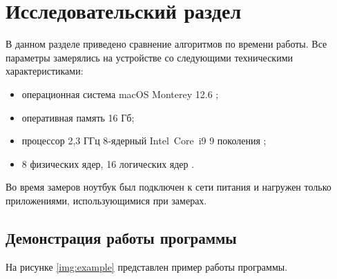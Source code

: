 \chapter{Исследовательский раздел}
\label{cha:research}

В данном разделе приведено сравнение алгоритмов по времени работы.
Все параметры замерялись на устройстве со следующими техническими характеристиками:
\begin{itemize}
	\item операционная система macOS Monterey 12.6 \cite{monterey};
	\item оперативная память 16 Гб;
	\item процессор 2,3 ГГц 8‑ядерный Intel Core i9 9 поколения \cite{intel};
	\item 8 физических ядер, 16 логических ядер \cite{intel}.
\end{itemize}

Во время замеров ноутбук был подключен к сети питания и нагружен только приложениями, использующимися при замерах.

\section{Демонстрация работы программы}

На рисунке \ref{img:example} представлен пример работы программы.

